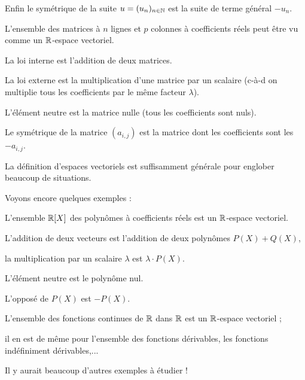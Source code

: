  
\change

Enfin le symétrique de la suite $u=(u_n)_{n \in \mathbb{N}}$ est la suite de terme général $-u_n.$



\diapo

L'ensemble des matrices à $n$ lignes et $p$ colonnes à coefficients 
réels peut être vu comme un $\mathbb{R}$-espace vectoriel.


\change

La loi interne est l'addition de deux matrices.

La loi externe est la multiplication d'une matrice par un scalaire (c-à-d on multiplie tous les coefficients par le même facteur $\lambda$).

L'élément neutre est la matrice nulle (tous les coefficients sont nuls).

Le symétrique de la matrice $(a_{i,j})$ est la matrice 
dont les coefficients sont les $-a_{i,j}$. 
 

\diapo

La définition d'espaces vectoriels est suffisamment générale pour englober
beaucoup de situations.

\change

Voyons encore quelques exemples :

L'ensemble $\mathbb{R}[X]$ des polynômes à coefficients réels
est un $\mathbb{R}$-espace vectoriel.

\change

L'addition de deux vecteurs est l'addition de deux polynômes $P(X)+Q(X)$, 

la multiplication par un scalaire 
  $\lambda$ est $\lambda \cdot P(X)$. 
  
  L'élément neutre est le polynôme nul. 
  
  L'opposé de $P(X)$ est $-P(X)$.
  
\change

L'ensemble des fonctions continues de $\mathbb{R}$ dans $\mathbb{R}$ est un $\mathbb{R}$-espace vectoriel ; 

\change

il en est de même pour l'ensemble des fonctions dérivables, les fonctions indéfiniment dérivables,...

\change

Il y aurait beaucoup d'autres exemples à étudier !

\diapo

